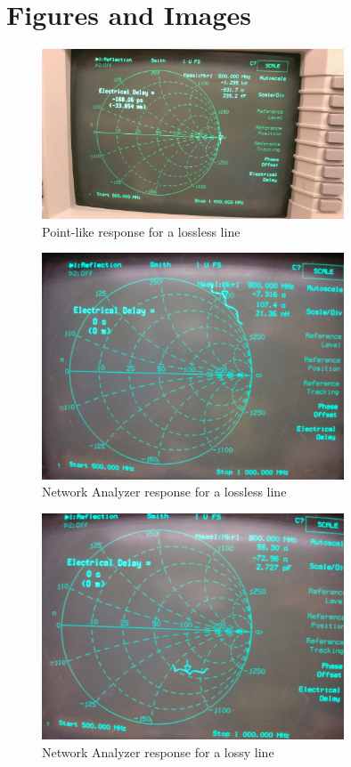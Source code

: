 \documentclass{article}
\begin{document}
\section{Figures and Images}
\begin{figure}[H]
    \centering
    \includegraphics[width=0.8\textwidth]{./Images/251.jpg}
    \caption{Point-like response for a lossless line}
\end{figure}
\begin{figure}[H]
    \centering
    \includegraphics[width=0.8\textwidth]{./Images/252lossless.jpg}
    \caption{Network Analyzer response for a lossless line}
\end{figure}
\begin{figure}[H]
    \centering
    \includegraphics[width=0.8\textwidth]{./Images/252lossy.jpg}
    \caption{Network Analyzer response for a lossy line}
\end{figure}
\end{document}
